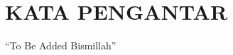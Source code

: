 \chapter*{\uppercase{KATA PENGANTAR}}
\vspace{1cm}

\begin{center}
    ``To Be Added Bismillah''
\end{center}

\newpage